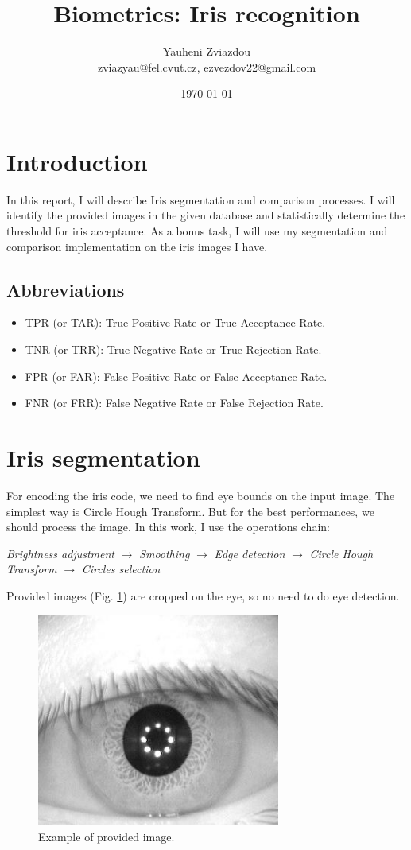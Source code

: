 \documentclass{article}
\title{Biometrics: Iris recognition}
\author{Yauheni Zviazdou \\ zviazyau@fel.cvut.cz, ezvezdov22@gmail.com}
\date{\today}
\begin{document}
\maketitle


\section{Introduction}
In this report, I will describe Iris segmentation and comparison processes.
I will identify the provided images in the given database and statistically determine the threshold for iris acceptance.
As a bonus task, I will use my segmentation and comparison implementation on the iris images I have.

\subsection{Abbreviations}
\begin{itemize}
  \item TPR (or TAR): True Positive Rate or True Acceptance Rate.
  \item TNR (or TRR): True Negative Rate or True Rejection Rate.
  \item FPR (or FAR): False Positive Rate or False Acceptance Rate.
  \item FNR (or FRR): False Negative Rate or False Rejection Rate.
\end{itemize}

\section{Iris segmentation}
For encoding the iris code, we need to find eye bounds on the input image. The simplest way is Circle Hough Transform.
But for the best performances, we should process the image.
In this work, I use the operations chain:

\textit{Brightness adjustment} $\rightarrow$ \textit{Smoothing} $\rightarrow$ \textit{Edge detection} $\rightarrow$ \textit{Circle Hough Transform} $\rightarrow$ \textit{Circles selection}

Provided images (Fig. \ref{ImgOriginal}) are cropped on the eye, so no need to do eye detection.

\begin{figure}[ht!]
  \centering
  \includegraphics[width=80mm]{Resources/eye-original.jpg}
  \caption{Example of provided image.}
  \label{ImgOriginal}
\end{figure}
\end{document}
